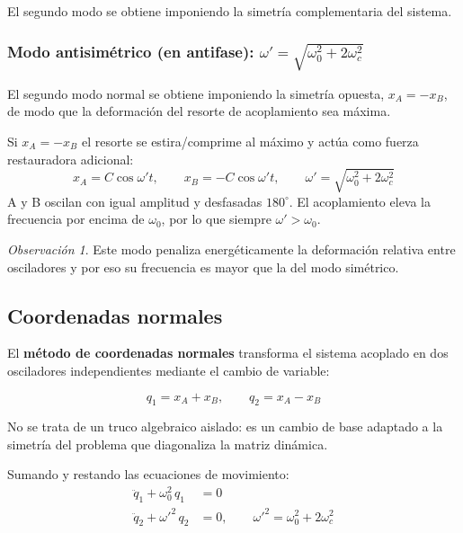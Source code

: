 \documentclass[12pt, a4paper]{article}
\theoremstyle{plain}
\theoremstyle{definition}
\theoremstyle{remark}
\newtheorem*{observacion}{Observación}
\begin{document}
El segundo modo se obtiene imponiendo la simetría complementaria del sistema.

\subsubsection{Modo antisimétrico (en antifase): \texorpdfstring{$\omega'=\sqrt{\omega_0^2+2\omega_c^2}$}{}}

El segundo modo normal se obtiene imponiendo la simetría opuesta, $x_A=-x_B$, de modo que
la deformación del resorte de acoplamiento sea máxima.

Si $x_A = -x_B$ el resorte se estira/comprime al máximo y actúa como fuerza restauradora
adicional:
\begin{equation}
  x_A = C\cos\omega' t,\qquad x_B = -C\cos\omega' t,\qquad
  \omega' = \sqrt{\omega_0^2 + 2\omega_c^2}
\end{equation}
A y B oscilan con igual amplitud y desfasadas $180^\circ$. El acoplamiento eleva la frecuencia
por encima de $\omega_0$, por lo que siempre $\omega' > \omega_0$.
\begin{observacion}
Este modo penaliza energéticamente la deformación relativa entre osciladores y por eso
su frecuencia es mayor que la del modo simétrico.
\end{observacion}

\subsection{Coordenadas normales}

El \textbf{método de coordenadas normales} transforma el sistema acoplado en dos
osciladores independientes mediante el cambio de variable:
\begin{mdframed}[style=resultado]
\begin{equation}
  q_1 = x_A + x_B,\qquad q_2 = x_A - x_B
\end{equation}
\end{mdframed}
No se trata de un truco algebraico aislado: es un cambio de base adaptado a la simetría
del problema que diagonaliza la matriz dinámica.

Sumando y restando las ecuaciones de movimiento:
\begin{align}
  \ddot{q}_1 + \omega_0^2\,q_1 &= 0 \label{eq:q1}\\
  \ddot{q}_2 + \omega'^2\,q_2  &= 0,\qquad \omega'^2 = \omega_0^2 + 2\omega_c^2
  \label{eq:q2}
\end{align}
\end{document}
